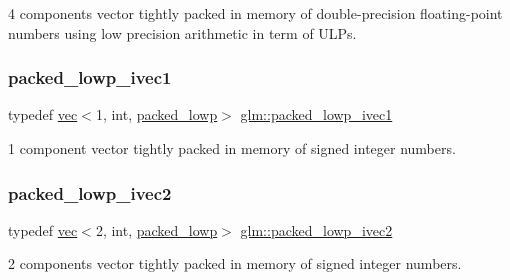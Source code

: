 4 components vector tightly packed in memory of double-\/precision floating-\/point numbers using low precision arithmetic in term of U\+L\+Ps. 

\mbox{\label{group__gtc__type__aligned_ga259a03c1d585f918f04230dde51cc95a}} 
\subsubsection{\texorpdfstring{packed\+\_\+lowp\+\_\+ivec1}{packed\_lowp\_ivec1}}
{\footnotesize\ttfamily typedef \mbox{\hyperlink{structglm_1_1vec}{vec}}$<$1, int, \mbox{\hyperlink{namespaceglm_a36ed105b07c7746804d7fdc7cc90ff25ac36a4bd74559be2c0b65bc48e5953b8b}{packed\+\_\+lowp}}$>$ \mbox{\hyperlink{group__gtc__type__aligned_ga259a03c1d585f918f04230dde51cc95a}{glm\+::packed\+\_\+lowp\+\_\+ivec1}}}



1 component vector tightly packed in memory of signed integer numbers. 

\mbox{\label{group__gtc__type__aligned_gabd82de5d7aef1f8373fe14cd05ce617c}} 
\subsubsection{\texorpdfstring{packed\+\_\+lowp\+\_\+ivec2}{packed\_lowp\_ivec2}}
{\footnotesize\ttfamily typedef \mbox{\hyperlink{structglm_1_1vec}{vec}}$<$2, int, \mbox{\hyperlink{namespaceglm_a36ed105b07c7746804d7fdc7cc90ff25ac36a4bd74559be2c0b65bc48e5953b8b}{packed\+\_\+lowp}}$>$ \mbox{\hyperlink{group__gtc__type__aligned_gabd82de5d7aef1f8373fe14cd05ce617c}{glm\+::packed\+\_\+lowp\+\_\+ivec2}}}



2 components vector tightly packed in memory of signed integer numbers. 

